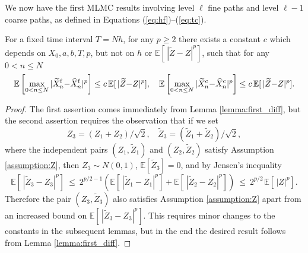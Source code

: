 \documentclass[review]{siamart190516}
\def \EE {{\mathbb{E}}}
\def \tZ {{\widetilde{Z}}}
\def \tXfn {{\widetilde{X}^{\rm f}_n}}
\def \tXcn {{\widetilde{X}^{\rm c}_n}}
\def \hXfn {{\widehat{X}^{\rm f}_n}}
\def \hXcn {{\widehat{X}^{\rm c}_n}}
\begin{document}
We now have the first MLMC results involving level $\ell$ fine paths
and level $\ell{-}1$ coarse paths, as defined in Equations
(\ref{eq:hf})--(\ref{eq:tc}).

\begin{lemma}
\label{lemma:first_diff_b}
For a fixed time interval $T\!=\!N h$, for any $p\!\geq\!2$ there exists a 
constant $c$ which depends on $X_0, a, b, T, p$, but not on $h$ or 
$\EE[\, |\tZ{-}Z|^p]$, such that for any $0\!<\!n\!\leq\!N$
\[
\EE\left[ \max_{0< n \leq N} |\tXfn{-}\hXfn|^p\right] \leq c\, \EE[\, |\tZ{-}Z|^p], ~~~ 
\EE\left[ \max_{0< n \leq N} |\tXcn{-}\hXcn|^p\right] \leq c\, \EE[\, |\tZ{-}Z|^p].
\]
\end{lemma}
\begin{proof}
The first assertion comes immediately from Lemma \ref{lemma:first_diff}, 
but the second assertion requires the observation that if we set
\[
 Z_3  = (  Z_1{+}  Z_2)/\sqrt{2}, ~~~~
\tZ_3 = (\tZ_1{+}\tZ_2)/\sqrt{2}, 
\]
where the independent pairs $(Z_1, \tZ_1)$ and $(Z_2, \tZ_2)$ satisfy 
Assumption \ref{assumption:Z}, then $Z_3 \sim N(0,1)$, $\EE[\tZ_3]\!=\!0$, 
and by Jensen's inequality
\[
\EE\left[\, | \tZ_3 {-} Z_3 |^p \right] \ \leq\ 
2^{p/2-1} \left( \EE[\, |\tZ_1{-}Z_1|^p] + \EE[\, |\tZ_2{-}Z_2|^p] \right)
\ \leq\ 2^{p/2\,} \EE[\, |Z|^p].
\]
Therefore the pair $(Z_3, \tZ_3)$ also satisfies Assumption 
\ref{assumption:Z} apart from an increased bound on 
$\EE\left[\, | \tZ_3 {-} Z_3 |^p \right]$.  This requires minor 
changes to the constants in the subsequent lemmas, but in the end 
the desired result follows from Lemma \ref{lemma:first_diff}.
\end{proof}
\end{document}
